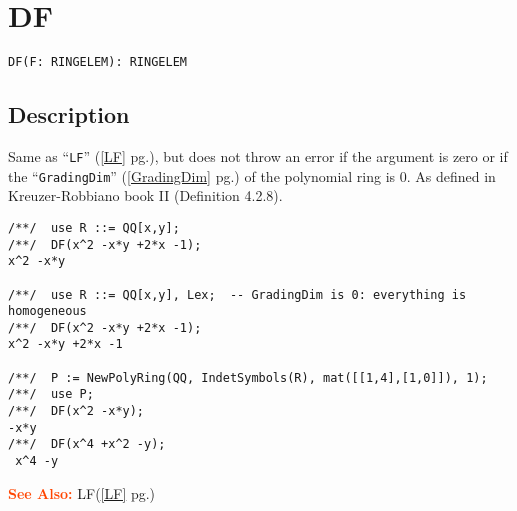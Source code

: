 \documentclass[a4paper]{mybook}
\newenvironment{command}{}{} %
\newcommand\SeeAlso{\par\textcolor{OrangeRed}{\textbf{\large See Also: }}}
\begin{document}
\section{DF}
\label{DF}
\begin{command} %


\begin{Verbatim}[label=syntax, rulecolor=\color{MidnightBlue},
frame=single]
DF(F: RINGELEM): RINGELEM
\end{Verbatim}


\subsection*{Description}

Same as ``\verb&LF&'' (\ref{LF} pg.\pageref{LF}), but does not throw an error if the argument
is zero or if the ``\verb&GradingDim&'' (\ref{GradingDim} pg.\pageref{GradingDim}) of the polynomial ring is 0.
As defined in Kreuzer-Robbiano book II (Definition 4.2.8).
\begin{Verbatim}[label=example, rulecolor=\color{PineGreen}, frame=single]
/**/  use R ::= QQ[x,y];
/**/  DF(x^2 -x*y +2*x -1);
x^2 -x*y

/**/  use R ::= QQ[x,y], Lex;  -- GradingDim is 0: everything is homogeneous
/**/  DF(x^2 -x*y +2*x -1);
x^2 -x*y +2*x -1

/**/  P := NewPolyRing(QQ, IndetSymbols(R), mat([[1,4],[1,0]]), 1);
/**/  use P;
/**/  DF(x^2 -x*y);
-x*y
/**/  DF(x^4 +x^2 -y);
 x^4 -y
\end{Verbatim}


\SeeAlso %
  LF(\ref{LF} pg.\pageref{LF})
\end{command} %
\end{document}
